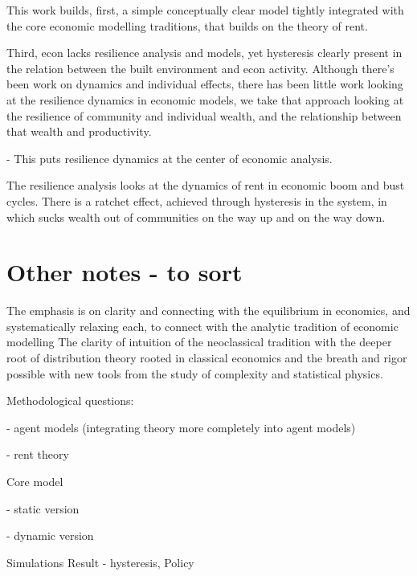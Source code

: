 This work builds, first, a simple conceptually clear model tightly integrated with the core economic modelling traditions, that builds on the theory of rent.


Third, econ lacks resilience analysis and models, yet hysteresis clearly present in the relation between the built environment and econ activity. Although there's been work on dynamics and individual effects, there has been little work looking at the resilience dynamics in economic models, we take that approach looking at the resilience of community and individual wealth, and the relationship between that wealth and productivity. 

- This puts resilience dynamics at the center of economic analysis.

The resilience analysis looks at the dynamics of rent in economic boom and bust cycles.
There is a ratchet effect, achieved through hysteresis in the system, in which sucks wealth out of communities on the way up and on the way down. %


\section{Other notes - to sort}


The emphasis is on clarity and connecting with the equilibrium in economics, and systematically relaxing each, to connect with the analytic tradition of economic modelling
The clarity of intuition of the neoclassical tradition with the deeper root of distribution theory rooted in classical economics and the breath and rigor possible with new tools from the study of complexity and statistical physics.

Methodological questions: 

    - agent models (integrating theory more completely into agent models)
    
    - rent theory

Core model

    - static version
    
    - dynamic version

Simulations
Result - hysteresis,
Policy
